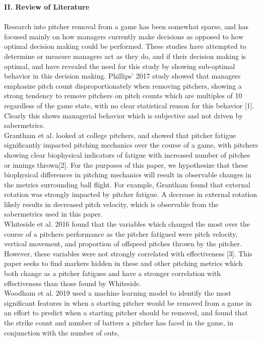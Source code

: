 \documentclass[12 pt]{article}
\begin{document}
\textbf{II. Review of Literature} \\ \\ 
\indent Research into pitcher removal from a game has been somewhat sparse, and has 
focused mainly on how managers currently make decisions as opposed to how optimal 
decision making could be performed. These studies have attempted to determine or measure 
managers act as they do, and if their decision making is optimal, and have revealed the
need for this study by showing sub-optimal behavior in this decision making. Phillips' 2017 
study showed that managers emphasize pitch count disproportionately when removing pitchers, 
showing a strong tendency to remove pitchers on pitch counts which are multiples of 
10 regardless of the game state, with no clear statistical reason for this behavior [1]. 
Clearly this shows managerial behavior which is subjective and not driven by sabermetrics. 
\\ \indent Grantham et al. looked at college pitchers, and showed that pitcher fatigue 
significantly impacted pitching mechanics over the course of a game, with pitchers showing 
clear biophysical indicators of fatigue with increased number of pitches or innings thrown[2]. 
For the purposes of this paper, we hypothesize that these biophysical differences in pitching mechanics
will result in observable changes in the metrics surrounding ball flight. For example, Grantham found that external rotation 
was strongly impacted by pitcher fatigue. A decrease in external rotation likely results in 
decreased pitch velocity, which is observable from the sabermetrics used in this paper.
\\ \indent Whiteside et al. 2016 found that the variables which changed the most 
over the course of a pitchers performance as the pitcher fatigued were pitch 
velocity, vertical movement, and proportion of offspeed pitches thrown by the pitcher. However, 
these variables were not strongly correlated with effectiveness [3]. This paper seeks to find markers 
hidden in these and other pitching metrics which both change as a pitcher fatigues and 
have a stronger correlation with effectiveness than those found by Whiteside.
\\ \indent Woodham et al. 2019 used a machine learning model to identify the most 
significant features in when a starting pitcher would be removed from a game in an effort 
to predict when a starting pitcher should be removed, and found that the strike count 
and number of batters a pitcher has faced in the game, in conjunction with the number of outs, 
\end{document}

